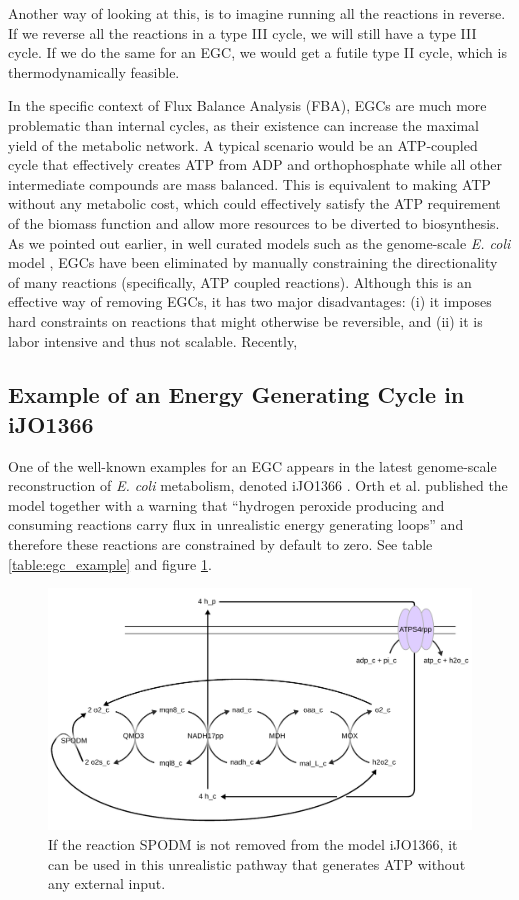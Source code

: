 \documentclass[twocolumn]{bmcart}%
\begin{document}
Another way of looking at this, is to imagine running all the reactions in reverse. If we reverse all the reactions in a type III cycle, we will still have a type III cycle. If we do the same for an EGC, we would get a futile type II cycle, which is thermodynamically feasible.

In the specific context of Flux Balance Analysis (FBA), EGCs are much more problematic than internal cycles, as their existence can increase the maximal yield of the metabolic network. A typical scenario would be an ATP-coupled cycle that effectively creates ATP from ADP and orthophosphate while all other intermediate compounds are mass balanced. This is equivalent to making ATP without any metabolic cost, which could effectively satisfy the ATP requirement of the biomass function and allow more resources to be diverted to biosynthesis. As we pointed out earlier, in well curated models such as the genome-scale \emph{E. coli} model \cite{Carrera2014-ys}, EGCs have been eliminated by manually constraining the directionality of many reactions (specifically, ATP coupled reactions). Although this is an effective way of removing EGCs, it has two major disadvantages: (i) it imposes hard constraints on reactions that might otherwise be reversible, and (ii) it is labor intensive and thus not scalable. Recently, 

\subsection*{Example of an Energy Generating Cycle in iJO1366}
One of the well-known examples for an EGC appears in the latest genome-scale reconstruction of \emph{E. coli} metabolism, denoted iJO1366 \cite{Orth2011-qi}. Orth et al. published the model together with a warning that ``hydrogen peroxide producing and consuming reactions carry flux in unrealistic energy generating loops'' and therefore these reactions are constrained by default to zero. 
See table \ref{table:egc_example} and figure \ref{fig:egc_example}.

\begin{figure}[h!]
	\includegraphics[width=6in]{figure2.pdf}
 	\caption{
 		If the reaction SPODM is not removed from the model iJO1366, it can
 		be used in this unrealistic pathway that generates ATP without any
 		external input.}
 	\label{fig:egc_example}
\end{figure}
\end{document}
